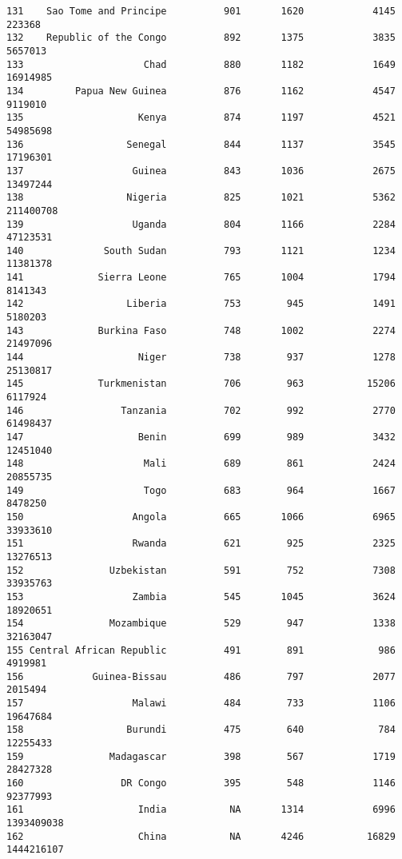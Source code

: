 \documentclass[
]{article}
\begin{document}
\begin{verbatim}
131    Sao Tome and Principe          901       1620            4145     223368
132    Republic of the Congo          892       1375            3835    5657013
133                     Chad          880       1182            1649   16914985
134         Papua New Guinea          876       1162            4547    9119010
135                    Kenya          874       1197            4521   54985698
136                  Senegal          844       1137            3545   17196301
137                   Guinea          843       1036            2675   13497244
138                  Nigeria          825       1021            5362  211400708
139                   Uganda          804       1166            2284   47123531
140              South Sudan          793       1121            1234   11381378
141             Sierra Leone          765       1004            1794    8141343
142                  Liberia          753        945            1491    5180203
143             Burkina Faso          748       1002            2274   21497096
144                    Niger          738        937            1278   25130817
145             Turkmenistan          706        963           15206    6117924
146                 Tanzania          702        992            2770   61498437
147                    Benin          699        989            3432   12451040
148                     Mali          689        861            2424   20855735
149                     Togo          683        964            1667    8478250
150                   Angola          665       1066            6965   33933610
151                   Rwanda          621        925            2325   13276513
152               Uzbekistan          591        752            7308   33935763
153                   Zambia          545       1045            3624   18920651
154               Mozambique          529        947            1338   32163047
155 Central African Republic          491        891             986    4919981
156            Guinea-Bissau          486        797            2077    2015494
157                   Malawi          484        733            1106   19647684
158                  Burundi          475        640             784   12255433
159               Madagascar          398        567            1719   28427328
160                 DR Congo          395        548            1146   92377993
161                    India           NA       1314            6996 1393409038
162                    China           NA       4246           16829 1444216107
\end{verbatim}
\end{document}
